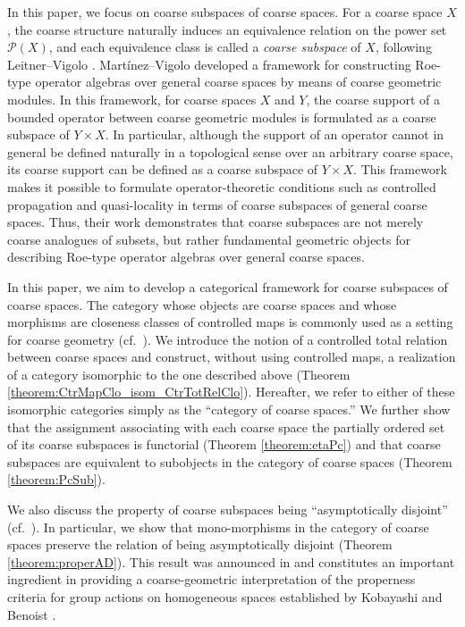 \documentclass[12pt, a4paper]{amsart}
\theoremstyle{definition}
\begin{document}
In this paper, we focus on coarse subspaces of coarse spaces.
For a coarse space $X$, the coarse structure naturally induces an equivalence relation on the power set $\mathcal{P}(X)$, and each equivalence class is called a \emph{coarse subspace} of $X$, following Leitner--Vigolo \cite{LeitnerVigolo2023}.
Mart\'{i}nez--Vigolo \cite{MartinezVigolo2026roe} developed a framework for constructing Roe-type operator algebras over general coarse spaces by means of coarse geometric modules.
In this framework, for coarse spaces $X$ and $Y$, the coarse support of a bounded operator between coarse geometric modules is formulated as a coarse subspace of $Y\times X$.
In particular, although the support of an operator cannot in general be defined naturally in a topological sense over an arbitrary coarse space, its coarse support can be defined as a coarse subspace of $Y\times X$.
This framework makes it possible to formulate operator-theoretic conditions such as controlled propagation and quasi-locality in terms of coarse subspaces of general coarse spaces.
Thus, their work demonstrates that coarse subspaces are not merely coarse analogues of subsets, but rather fundamental geometric objects for describing Roe-type operator algebras over general coarse spaces.

In this paper, we aim to develop a categorical framework for coarse subspaces of coarse spaces.
The category whose objects are coarse spaces and whose morphisms are closeness classes of controlled maps is commonly used as a setting for coarse geometry
(cf.~\cite{DikranjanZava2017,Zava2019CoarseCat}).
We introduce the notion of a controlled total relation between coarse spaces and construct, without using controlled maps, a realization of a category isomorphic to the one described above (Theorem \ref{theorem:CtrMapClo_isom_CtrTotRelClo}).
Hereafter, we refer to either of these isomorphic categories simply as the ``category of coarse spaces.''
We further show that the assignment associating with each coarse space the partially ordered set of its coarse subspaces is functorial (Theorem \ref{theorem:etaPc}) and that coarse subspaces are equivalent to subobjects in the category of coarse spaces (Theorem \ref{theorem:PcSub}).

We also discuss the property of coarse subspaces being ``asymptotically disjoint''
(cf.~\cite{Dranishnikov2001,Protasov2003}).
In particular, we show that mono-morphisms in the category of coarse spaces preserve the relation of being asymptotically disjoint (Theorem \ref{theorem:properAD}).
This result was announced in \cite{NagayaOgawaOkuda2025} and constitutes an important ingredient in providing a coarse-geometric interpretation of the properness criteria for group actions on homogeneous spaces established by Kobayashi
\cite{Kobayashi89,Kobayashi96} and Benoist \cite{Benoist96}.
\end{document}
